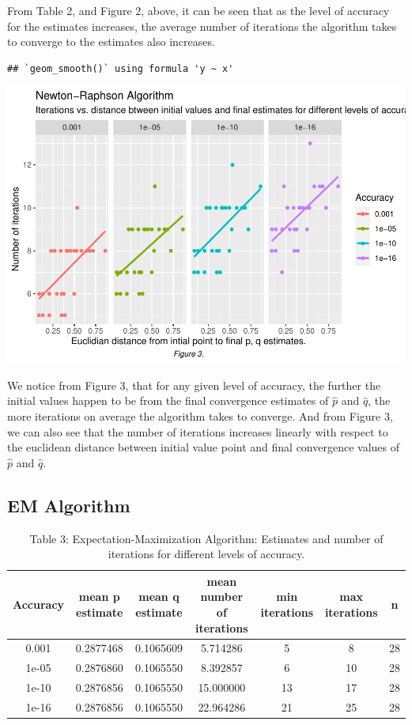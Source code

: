 \documentclass[]{article}
\begin{document}
From Table 2, and Figure 2, above, it can be seen that as the level of
accuracy for the estimates increases, the average number of iterations
the algorithm takes to converge to the estimates also increases.

\begin{verbatim}
## `geom_smooth()` using formula 'y ~ x'
\end{verbatim}

\includegraphics{Rmarkdown_Faizan_HW1_CHL5224_Statistical_Genetics_files/figure-latex/unnamed-chunk-6-1.pdf}

We notice from Figure 3, that for any given level of accuracy, the
further the initial values happen to be from the final convergence
estimates of \(\hat{p}\) and \(\hat{q}\), the more iterations on average
the algorithm takes to converge. And from Figure 3, we can also see that
the number of iterations increases linearly with respect to the
euclidean distance between initial value point and final convergence
values of \(\hat{p}\) and \(\hat{q}\).

\subsection{EM Algorithm}\label{em-algorithm}

\begin{table}[t]

\caption{\label{tab:unnamed-chunk-9}Table 3: Expectation-Maximization Algorithm: Estimates and number of iterations for different levels of accuracy.}
\centering
\begin{tabular}{c|c|c|c|c|c|c}
\hline
Accuracy & mean p estimate & mean q estimate & mean number of iterations & min iterations & max iterations & n\\
\hline
0.001 & 0.2877468 & 0.1065609 & 5.714286 & 5 & 8 & 28\\
\hline
1e-05 & 0.2876860 & 0.1065550 & 8.392857 & 6 & 10 & 28\\
\hline
1e-10 & 0.2876856 & 0.1065550 & 15.000000 & 13 & 17 & 28\\
\hline
1e-16 & 0.2876856 & 0.1065550 & 22.964286 & 21 & 25 & 28\\
\hline
\end{tabular}
\end{table}
\end{document}
